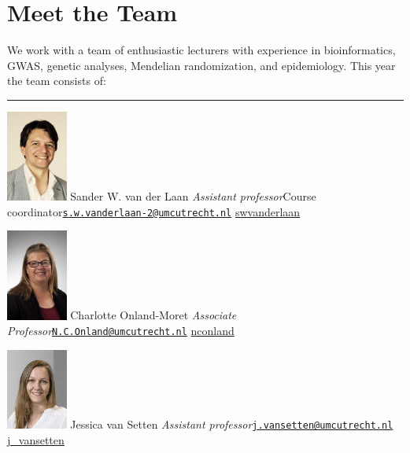 \documentclass[
]{book}
\begin{document}
\hypertarget{meet-the-team}{%
\section{Meet the Team}\label{meet-the-team}}

We work with a team of enthusiastic lecturers with experience in bioinformatics, GWAS, genetic analyses, Mendelian randomization, and epidemiology. This year the team consists of:

\begin{center}\rule{0.5\linewidth}{0.5pt}\end{center}

\includegraphics[width=0.15\textwidth,height=\textheight]{img/_team/sander_vander_laan.jpg} Sander W. van der Laan \emph{Assistant professor}Course coordinator\href{mailto:s.w.vanderlaan-2@umcutrecht.nl}{\nolinkurl{s.w.vanderlaan-2@umcutrecht.nl}} \textbar{} \href{http://www.twitter.com/swvanderlaan}{swvanderlaan}

\includegraphics[width=0.15\textwidth,height=\textheight]{img/_team/charlotte_onland.jpg} Charlotte Onland-Moret \emph{Associate Professor}\href{mailto:N.C.Onland@umcutrecht.nl}{\nolinkurl{N.C.Onland@umcutrecht.nl}} \textbar{} \href{http://www.twitter.com/nconland}{nconland}

\includegraphics[width=0.15\textwidth,height=\textheight]{img/_team/jessica_van_setten.jpg} Jessica van Setten \emph{Assistant professor}\href{mailto:j.vansetten@umcutrecht.nl}{\nolinkurl{j.vansetten@umcutrecht.nl}} \textbar{} \href{http://www.twitter.com/j_vansetten}{j\_vansetten}
\end{document}
